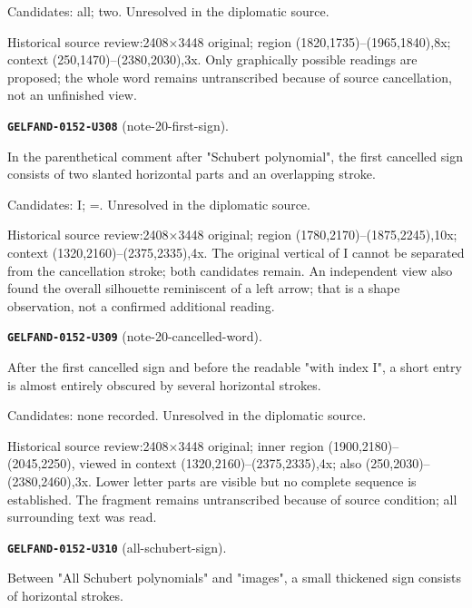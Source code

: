 Candidates: all; two. Unresolved in the diplomatic source.\par
Historical source review:2408×3448 original; region (1820,1735)–(1965,1840),8x; context (250,1470)–(2380,2030),3x. Only graphically possible readings are proposed; the whole word remains untranscribed because of source cancellation, not an unfinished view.\par\medskip
\par\noindent\leavevmode{}\label{GELFAND-0152-U308}\textbf{\texttt{GELFAND-0152-U308}} (note-20-first-sign).\nopagebreak[4]\par
In the parenthetical comment after "Schubert polynomial", the first cancelled sign consists of two slanted horizontal parts and an overlapping stroke.\par
Candidates: I; =. Unresolved in the diplomatic source.\par
Historical source review:2408×3448 original; region (1780,2170)–(1875,2245),10x; context (1320,2160)–(2375,2335),4x. The original vertical of I cannot be separated from the cancellation stroke; both candidates remain. An independent view also found the overall silhouette reminiscent of a left arrow; that is a shape observation, not a confirmed additional reading.\par\medskip
\par\noindent\leavevmode{}\label{GELFAND-0152-U309}\textbf{\texttt{GELFAND-0152-U309}} (note-20-cancelled-word).\nopagebreak[4]\par
After the first cancelled sign and before the readable "with index I", a short entry is almost entirely obscured by several horizontal strokes.\par
Candidates: none recorded. Unresolved in the diplomatic source.\par
Historical source review:2408×3448 original; inner region (1900,2180)–(2045,2250), viewed in context (1320,2160)–(2375,2335),4x; also (250,2030)–(2380,2460),3x. Lower letter parts are visible but no complete sequence is established. The fragment remains untranscribed because of source condition; all surrounding text was read.\par\medskip
\par\noindent\leavevmode{}\label{GELFAND-0152-U310}\textbf{\texttt{GELFAND-0152-U310}} (all-schubert-sign).\nopagebreak[4]\par
Between "All Schubert polynomials" and "images", a small thickened sign consists of horizontal strokes.\par
